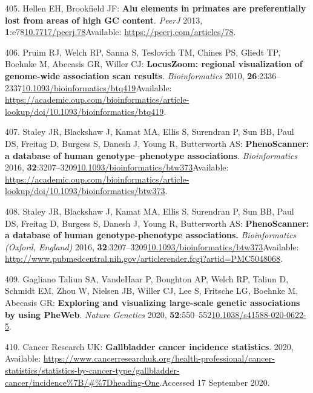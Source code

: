 \documentclass[
]{book}
\begin{document}
\leavevmode\hypertarget{ref-Hellen2013}{}%
405. Hellen EH, Brookfield JF: \textbf{Alu elements in primates are preferentially lost from areas of high GC content}. \emph{PeerJ} 2013, \textbf{1}:e78\href{https://doi.org/10.7717/peerj.78}{10.7717/peerj.78}Available: \url{https://peerj.com/articles/78}.

\leavevmode\hypertarget{ref-Pruim2011}{}%
406. Pruim RJ, Welch RP, Sanna S, Teslovich TM, Chines PS, Gliedt TP, Boehnke M, Abecasis GR, Willer CJ: \textbf{LocusZoom: regional visualization of genome-wide association scan results}. \emph{Bioinformatics} 2010, \textbf{26}:2336--2337\href{https://doi.org/10.1093/bioinformatics/btq419}{10.1093/bioinformatics/btq419}Available: \url{https://academic.oup.com/bioinformatics/article-lookup/doi/10.1093/bioinformatics/btq419}.

\leavevmode\hypertarget{ref-Staley2016}{}%
407. Staley JR, Blackshaw J, Kamat MA, Ellis S, Surendran P, Sun BB, Paul DS, Freitag D, Burgess S, Danesh J, Young R, Butterworth AS: \textbf{PhenoScanner: a database of human genotype--phenotype associations}. \emph{Bioinformatics} 2016, \textbf{32}:3207--3209\href{https://doi.org/10.1093/bioinformatics/btw373}{10.1093/bioinformatics/btw373}Available: \url{https://academic.oup.com/bioinformatics/article-lookup/doi/10.1093/bioinformatics/btw373}.

\leavevmode\hypertarget{ref-Kamat2019}{}%
408. Staley JR, Blackshaw J, Kamat MA, Ellis S, Surendran P, Sun BB, Paul DS, Freitag D, Burgess S, Danesh J, Young R, Butterworth AS: \textbf{PhenoScanner: a database of human genotype-phenotype associations.} \emph{Bioinformatics (Oxford, England)} 2016, \textbf{32}:3207--3209\href{https://doi.org/10.1093/bioinformatics/btw373}{10.1093/bioinformatics/btw373}Available: \url{http://www.pubmedcentral.nih.gov/articlerender.fcgi?artid=PMC5048068}.

\leavevmode\hypertarget{ref-GaglianoTaliun2020}{}%
409. Gagliano Taliun SA, VandeHaar P, Boughton AP, Welch RP, Taliun D, Schmidt EM, Zhou W, Nielsen JB, Willer CJ, Lee S, Fritsche LG, Boehnke M, Abecasis GR: \textbf{Exploring and visualizing large-scale genetic associations by using PheWeb}. \emph{Nature Genetics} 2020, \textbf{52}:550--552\href{https://doi.org/10.1038/s41588-020-0622-5}{10.1038/s41588-020-0622-5}.

\leavevmode\hypertarget{ref-CancerResearchUK2020}{}%
410. Cancer Research UK: \textbf{Gallbladder cancer incidence statistics}. 2020, Available: \url{https://www.cancerresearchuk.org/health-professional/cancer-statistics/statistics-by-cancer-type/gallbladder-cancer/incidence\%7B/\#\%7Dheading-One}.Accessed 17 September 2020.
\end{document}

